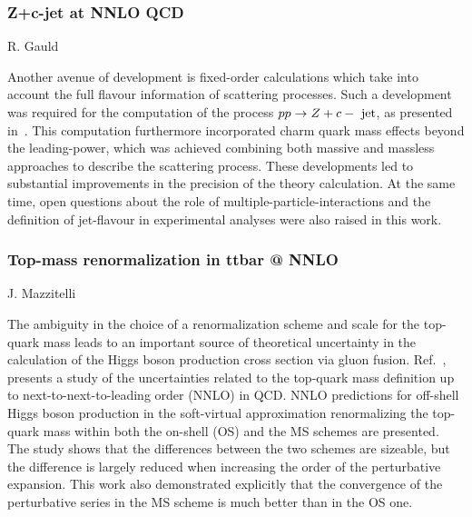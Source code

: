 \documentclass{FBR_Bericht_2025}
\begin{document}
\begin{refsection}
%
\subsubsection{Z+c-jet at NNLO QCD}
\begin{Namen}
R. Gauld
\end{Namen}
%
Another avenue of development is fixed-order calculations which take into account the full flavour information of scattering processes.
Such a development was required for the computation of the process $pp \to Z + c-{\rm~jet}$, as presented in~. 
%
This computation furthermore incorporated charm quark mass effects beyond the leading-power, which was achieved combining both massive and massless approaches to describe the scattering process.
%
These developments led to substantial improvements in the precision of the theory calculation. At the same time, open questions about the role of multiple-particle-interactions and the definition of jet-flavour in experimental analyses were also raised in this work.


\subsubsection{Top-mass renormalization in ttbar @ NNLO}
\begin{Namen}
J. Mazzitelli
\end{Namen}
The ambiguity in the choice of a renormalization scheme and scale for
the top-quark mass leads to an important source of theoretical
uncertainty in the calculation of the Higgs boson production cross
section via gluon fusion.  Ref.~\cite{Mazzitelli:2022scc}, presents a
study of the uncertainties related to the top-quark mass definition up
to next-to-next-to-leading order (NNLO) in QCD.  NNLO predictions for
off-shell Higgs boson production in the soft-virtual approximation
renormalizing the top-quark mass within both the on-shell (OS) and the
MS schemes are presented. The study shows that the differences between
the two schemes are sizeable, but the difference is largely reduced
when increasing the order of the perturbative expansion. This work
also demonstrated explicitly that the convergence of the perturbative
series in the MS scheme is much better than in the OS one.
%
\printbibliography[heading=subbibliography]
\end{refsection}


\end{document}

